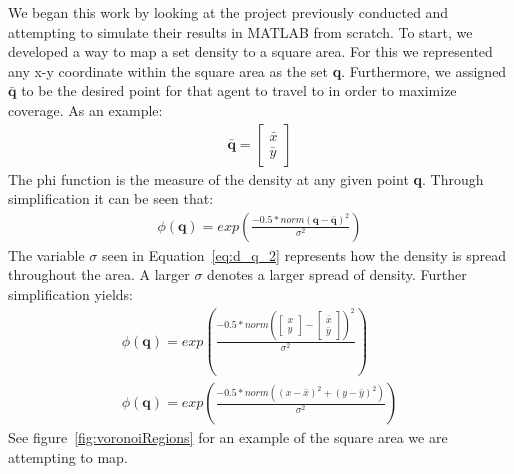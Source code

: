  We began this work by looking at the project previously conducted and attempting to simulate their results in MATLAB from scratch. To start, we developed a way to map a set density to a square area. For this we represented any x-y coordinate within the square area as the set \textbf{q}. Furthermore, we assigned \begin{math}\mathbf{\bar{q}}\end{math} to be the desired point for that agent to travel to in order to maximize coverage. As an example:
\begin{align}
    \mathbf{\bar{q}} = \begin{bmatrix} \bar{x} \\ \bar{y} \end{bmatrix} 
    \label{eq:d_q_1}
\end{align}
The phi function is the measure of the density at any given point \textbf{q}. Through simplification it can be seen that:
\begin{align}
    \phi(\mathbf{q}) = exp(\frac{-0.5*norm(\mathbf{q - \bar{\mathbf{q}}})^2}{\sigma^2})
    \label{eq:d_q_2}
\end{align}
The variable $\sigma$ seen in Equation~\eqref{eq:d_q_2} represents how the density is spread throughout the area. A larger $\sigma$ denotes a larger spread of density. Further simplification yields:
\begin{align}
    \phi(\mathbf{q}) = exp(\frac{-0.5*norm(\begin{bmatrix} x \\ y \end{bmatrix} - \begin{bmatrix} \bar{x} \\ \bar{y} \end{bmatrix})^2}{\sigma^2}) \\
    \label{eq:d_q_3}
    \phi(\mathbf{q}) = exp(\frac{-0.5*norm((x-\bar{x})^2 + (y-\bar{y})^2)}{\sigma^2})
\end{align}
See figure~\ref{fig:voronoiRegions} for an example of the square area we are attempting to map. 


